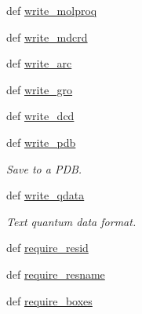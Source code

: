 \begin{DoxyCompactItemize}
\item 
def \hyperlink{classforcebalance_1_1molecule_1_1Molecule_aba14226f272f91c91ecf7060ff136a2b}{write\-\_\-molproq}
\item 
def \hyperlink{classforcebalance_1_1molecule_1_1Molecule_aab5ea35ab9d68559fd6ea7b747c2bddb}{write\-\_\-mdcrd}
\item 
def \hyperlink{classforcebalance_1_1molecule_1_1Molecule_a95782abfb36e7080a1b98bfad2ced4f3}{write\-\_\-arc}
\item 
def \hyperlink{classforcebalance_1_1molecule_1_1Molecule_a503eae2cee228e4cc5fc736504714925}{write\-\_\-gro}
\item 
def \hyperlink{classforcebalance_1_1molecule_1_1Molecule_a0dee435704418bf51199d6bab6d92249}{write\-\_\-dcd}
\item 
def \hyperlink{classforcebalance_1_1molecule_1_1Molecule_a47082443566cd50add3f2ec20af9cc10}{write\-\_\-pdb}
\begin{DoxyCompactList}\small\item\em Save to a P\-D\-B. \end{DoxyCompactList}\item 
def \hyperlink{classforcebalance_1_1molecule_1_1Molecule_a1ef6aefd3218f8ab3f9dc2b37e602fbf}{write\-\_\-qdata}
\begin{DoxyCompactList}\small\item\em Text quantum data format. \end{DoxyCompactList}\item 
def \hyperlink{classforcebalance_1_1molecule_1_1Molecule_a90fe456919fda305703e36af389e60e1}{require\-\_\-resid}
\item 
def \hyperlink{classforcebalance_1_1molecule_1_1Molecule_ad47d05a3ea76e013a628bd7b25ae3050}{require\-\_\-resname}
\item 
def \hyperlink{classforcebalance_1_1molecule_1_1Molecule_a03af3cfb99ea8f1c8c7e93d04bdcf967}{require\-\_\-boxes}
\end{DoxyCompactItemize}
